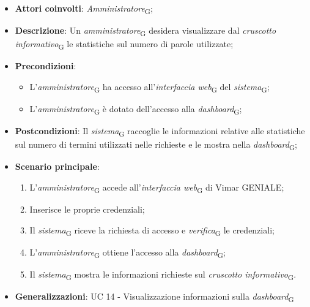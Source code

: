 \begin{itemize}
    \item \textbf{Attori coinvolti}: \textit{Amministratore}\textsubscript{G};
    \item \textbf{Descrizione}: Un \textit{amministratore}\textsubscript{G} desidera visualizzare dal \textit{cruscotto informativo}\textsubscript{G} le statistiche sul numero di parole utilizzate;
    \item \textbf{Precondizioni}: 
        \begin{itemize}
            \item L’\textit{amministratore}\textsubscript{G} ha accesso all’\textit{interfaccia web}\textsubscript{G} del \textit{sistema}\textsubscript{G};
            \item L’\textit{amministratore}\textsubscript{G} è dotato dell’accesso alla \textit{dashboard}\textsubscript{G};
        \end{itemize}
    \item \textbf{Postcondizioni}: Il \textit{sistema}\textsubscript{G} raccoglie le informazioni relative alle statistiche sul numero di termini utilizzati nelle richieste e le mostra nella \textit{dashboard}\textsubscript{G};
    \item \textbf{Scenario principale}:
    \begin{enumerate}
    \item L’\textit{amministratore}\textsubscript{G} accede all’\textit{interfaccia web}\textsubscript{G} di Vimar GENIALE;
    \item Inserisce le proprie credenziali;
    \item Il \textit{sistema}\textsubscript{G} riceve la richiesta di accesso e \textit{verifica}\textsubscript{G} le credenziali;
    \item L’\textit{amministratore}\textsubscript{G} ottiene l’accesso alla \textit{dashboard}\textsubscript{G};
    \item Il \textit{sistema}\textsubscript{G} mostra le informazioni richieste sul \textit{cruscotto informativo}\textsubscript{G}.
    \end{enumerate}
    \item \textbf{Generalizzazioni}: UC 14 - Visualizzazione informazioni sulla \textit{dashboard}\textsubscript{G}
\end{itemize}

